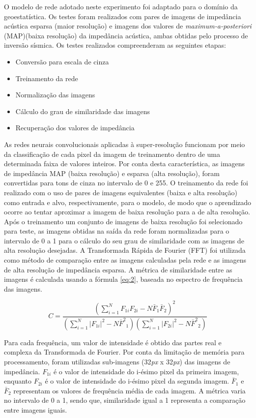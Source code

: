 \documentclass[11pt]{article}
\begin{document}
O modelo de rede adotado neste experimento foi adaptado para o domínio da geoestatística. Os testes
foram realizados com pares de imagens de impedância acústica esparsa (maior resolução) e 
imagens dos valores de \textit{maximum-a-posteriori} (MAP)(baixa resolução) da impedância acústica,
ambas obtidas pelo processo de inversão sísmica. Os testes realizados compreenderam as seguintes etapas:
 \begin{itemize}
   \item Conversão para escala de cinza
   \item Treinamento da rede
   \item Normalização das imagens
   \item Cálculo do grau de similaridade das imagens
   \item Recuperação dos valores de impedância
 \end{itemize}

As redes neurais convolucionais aplicadas à super-resolução funcionam por meio da classificação de cada pixel da 
imagem de treinamento dentro de uma determinada faixa de valores inteiros. Por conta desta
característica, as imagens de impedância MAP (baixa resolução)
e esparsa (alta resolução), foram convertidas para tons de cinza no intervalo de
0 e 255. O treinamento da rede foi realizado com o uso de pares de imagens equivalentes (baixa e alta resolução)
como entrada e alvo, respectivamente, para o modelo, de modo que o aprendizado ocorre ao tentar aproximar a
imagem de baixa resolução para a de alta resolução. Após o treinamento um conjunto de imagens de baixa resolução
foi  selecionado para teste, as imagens obtidas na saída da rede foram normalizadas para o intervalo de 0 a 1
para o cálculo do seu grau de similaridade com as imagens de alta resolução desejadas.
A Transformada Rápida de Fourier (FFT) foi utilizada como método de comparação entre as imagens calculadas pela rede
e as imagens de alta resolução de impedância esparsa. A métrica de similaridade entre as imagens é calculada usando a fórmula \ref{eq:2}, baseada
no espectro de frequência das imagens.

\begin{equation}
 C = \frac{ (\sum_{i=1}^{N}{F_{1i}F_{2i}} - N \bar{F}_1\bar{F}_2 )^2 }{ (\sum_{i=1}^{N}{|F_{1i}|^2} - N{\bar{F}^2}_1)( \sum_{i=1}^{N}{|F_{2i}|^2} - N{\bar{F}^2}_2 ) }
 \label{eq:2}
\end{equation}

Para cada frequência, um valor de intensidade é obtido das partes real e complexa da Transformada de Fourier.
Por conta da limitação de memória para processamento, foram utilizadas sub-imagens (32\textit{px} x 32\textit{px}) das
imagens de impedância. $F_{1i}$ é o valor de intensidade do i-ésimo pixel da primeira imagem, enquanto $F_{2i}$
é o valor de intensidade do i-ésimo pixel da segunda imagem. $\bar{F}_1$ e $\bar{F}_2$ representam os valores
de frequência média de cada imagem. A métrica varia no intervalo de 0 a 1, sendo que, similaridade igual a 1
representa a comparação entre imagens iguais.
\end{document}
